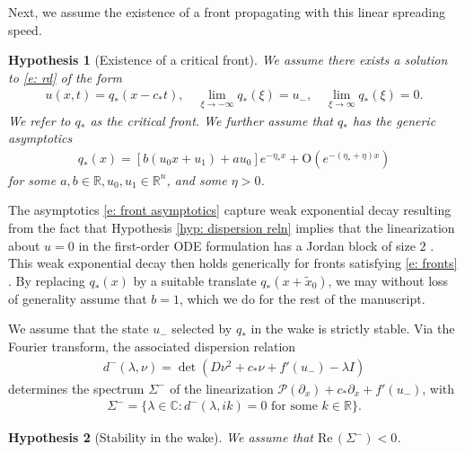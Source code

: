 \documentclass[11pt]{article}
\newcommand{\R}{\mathbb{R}}
\newcommand{\C}{\mathbb{C}}
\renewcommand{\Re}{\mathrm{Re} \,}
\newtheorem{hyp}{Hypothesis}
\numberwithin{equation}{section}
\numberwithin{prop}{section}
\begin{document}
Next, we assume the existence of a front propagating with this linear spreading speed. 
\begin{hyp}[Existence of a critical front]\label{hyp: front existence}
	We assume there exists a solution to \eqref{e: rd} of the form 
	\begin{align}
	u(x,t) = q_* (x-c_*t), \quad \lim_{\xi \to -\infty} q_* (\xi) = u_-,\quad \lim_{\xi \to \infty} q_*(\xi) = 0. \label{e: fronts}
	\end{align}
	We refer to $q_*$ as the critical front. We further assume that $q_*$ has the generic asymptotics 
	\begin{align}
	q_* (x) = \left[ b (u_0 x + u_1) + a u_0 \right] e^{-\eta_* x} + \mathrm{O}(e^{-(\eta_*+ \eta) x}) \label{e: front asymptotics}
	\end{align}
	for some $a, b \in \R, u_0, u_1 \in \R^n$, and some $\eta > 0$.  
\end{hyp}
The asymptotics \eqref{e: front asymptotics} capture weak exponential decay resulting from the fact that Hypothesis \ref{hyp: dispersion reln} implies that the linearization about $u = 0$ in the first-order ODE formulation has a Jordan block of size $2$  \cite{HolzerScheelPointwiseGrowth}. This weak exponential decay then holds generically for fronts satisfying \eqref{e: fronts} \cite{AveryHolzerScheel, SIMA}. By replacing $q_*(x)$ by a suitable translate $q_*(x+\tilde{x}_0)$, we may without loss of generality assume that $b = 1$, which we do for the rest of the manuscript.  

We assume that the state $u_-$ selected by $q_*$ in the wake is strictly stable.  Via the Fourier transform, the associated dispersion relation
\begin{align}
d^- (\lambda, \nu) = \det (D \nu^2  + c_* \nu + f'(u_-) - \lambda I)
\end{align}
determines the spectrum $\Sigma^-$ of the linearization $\mathcal{P}(\partial_x) + c_* \partial_x + f'(u_-)$, with
\begin{align}
\Sigma^- = \{ \lambda \in \C: d^- (\lambda, ik) = 0 \text{ for some } k \in \R \}. 
\end{align}

\begin{hyp}[Stability in the wake]\label{hyp: stability on left}
	We assume that $\Re (\Sigma^-) < 0$. 
\end{hyp}
\end{document}

